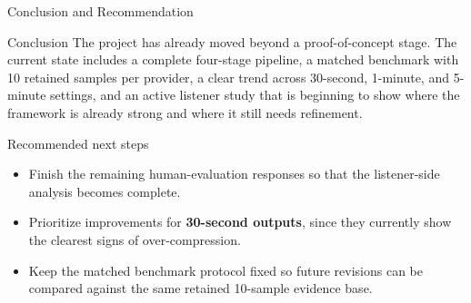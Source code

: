 \documentclass[aspectratio=169,10pt]{beamer}
\newcommand{\framebibtext}{}
\newcommand{\setframebib}[1]{\gdef\framebibtext{#1}}
\newcommand{\refSPORC}{[1] B.~R. Litterer, D.~Jurgens, and D.~Card, ``Mapping the Podcast Ecosystem with the Structured Podcast Research Corpus,'' in \emph{Proc. 63rd Annu. Meeting Assoc. Comput. Linguistics (Vol. 1: Long Papers)}, Vienna, Austria, 2025, pp.~25132--25154, doi: 10.18653/v1/2025.acl-long.1222.}
\newcommand{\refHumanEval}{[5] ``Human-evaluation response CSV and listener-response log,'' unpublished raw evaluation data, Apr. 2026.}
\begin{document}
\begin{frame}{Conclusion and Recommendation}
\setframebib{\refSPORC\quad\refHumanEval}
\small
\begin{block}{Conclusion}
The project has already moved beyond a proof-of-concept stage. The current state includes a complete four-stage pipeline, a matched benchmark with 10 retained samples per provider, a clear trend across 30-second, 1-minute, and 5-minute settings, and an active listener study that is beginning to show where the framework is already strong and where it still needs refinement.
\end{block}

\begin{block}{Recommended next steps}
\begin{itemize}
  \item Finish the remaining human-evaluation responses so that the listener-side analysis becomes complete.
  \item Prioritize improvements for \textbf{30-second outputs}, since they currently show the clearest signs of over-compression.
  \item Keep the matched benchmark protocol fixed so future revisions can be compared against the same retained 10-sample evidence base.
\end{itemize}
\end{block}
\end{frame}
\end{document}
